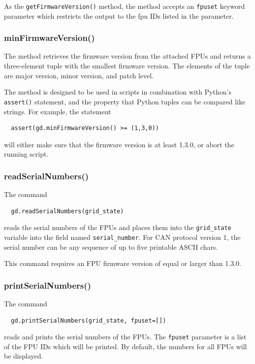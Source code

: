 \documentclass[11pt,a4paper]{scrartcl}
\begin{document}
As the \texttt{getFirmwareVersion()} method, the method accepts an
\texttt{fpuset} keyword parameter which restricts the output to the fpu IDs
listed in the parameter.

\subsubsection{minFirmwareVersion()}
\label{sec:minfirmwareversion}
The method retrieves the firmware version from the attached FPUs and
returns a three-element tuple with the smallest firmware version.  The
elements of the tuple are major version, minor version, and patch
level.

The method is designed to be used in scripts in combination with
Python's \texttt{assert()} statement, and the property that Python
tuples can be compared like strings. For example, the statement
\begin{verbatim}
  assert(gd.minFirmwareVersion() >= (1,3,0))
\end{verbatim}
will either make sure that the firmware version is at least 1.3.0, or
abort the running script.

\subsubsection{readSerialNumbers()}

The command
\begin{verbatim}
  gd.readSerialNumbers(grid_state)
\end{verbatim}
reads the serial numbers of the FPUs and places them into the
\texttt{grid\_state} variable into the field named
\texttt{serial\_number}. For CAN protocol version 1, the serial number
can be any sequence of up to five printable ASCII chars.

This command requires an FPU firmware version of equal or larger than
1.3.0.

\subsubsection{printSerialNumbers()}

The command
\begin{verbatim}
  gd.printSerialNumbers(grid_state, fpuset=[])
\end{verbatim}
reads and prints the serial numbers of the FPUs.  The \texttt{fpuset}
parameter is a list of the FPU IDs which will be printed. By default,
the numbers for all FPUs will be displayed.
\end{document}
